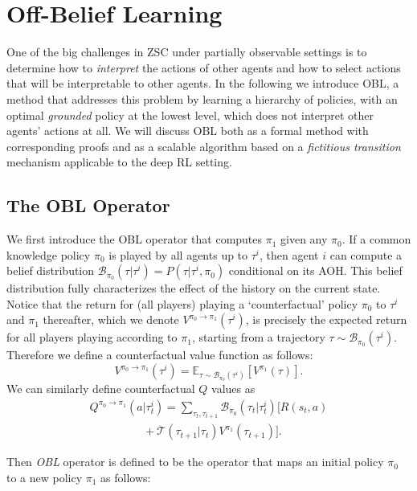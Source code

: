 \section{Off-Belief Learning}
\label{sec:method}
One of the big challenges in ZSC under partially observable settings is to determine how to \emph{interpret} the actions of other agents and how to select actions that will be interpretable to other agents. 
In the following we introduce OBL, a method that addresses this problem by learning a hierarchy of policies, with an optimal \emph{grounded} policy at the lowest level, which does not interpret other agents' actions at all.
We will discuss OBL both as a formal method with corresponding proofs and as a scalable algorithm based on a \emph{fictitious transition} mechanism applicable to the deep RL setting.

\subsection{The OBL Operator}
We first introduce the OBL operator that computes $\pi_1$ given any $\pi_0$. 
If a common knowledge policy $\pi_0$ is played by all agents up to $\tau^i$, then agent $i$ can compute a belief distribution $\mathcal{B}_{\pi_0}(\tau|\tau^i)=P(\tau|\tau^i,\pi_0)$ 
conditional on its AOH. This belief distribution fully characterizes the effect of the history on the current state. Notice that the return for (all players) playing a `counterfactual' policy $\pi_0$ 
to $\tau^i$ and $\pi_1$ thereafter, which we denote $V^{\pi_0 \to \pi_1}(\tau^i)$, is precisely the expected return for all players playing according to $\pi_1$, starting from a trajectory $\tau \sim \mathcal{B}_{\pi_0}(\tau^i)$. Therefore we define a counterfactual value function as follows:
\begin{equation}
    V^{\pi_0 \to \pi_1}(\tau^i) = \mathbb{E}_{\tau \sim \mathcal{B}_{\pi_0}(\tau^i)}\left[ V^{\pi_1}(\tau) \right].
    \label{eq:V_counterfactual}
\end{equation}
We can similarly define counterfactual $Q$ values as
\begin{multline}
    Q^{\pi_0 \to \pi_1}(a|\tau_t^i) = \sum_{\tau_t,\tau_{t+1}}\mathcal{B}_{\pi_0}(\tau_t|\tau_t^i) \big[ R(s_t, a) \\
    \hspace{2cm} + \mathcal{T}(\tau_{t+1}|\tau_t) V^{\pi_1}(\tau_{t+1})\big].
    \label{eq:Q_counterfactual}
\end{multline}

Then \textit{OBL} operator is defined to be the operator that maps an initial policy $\pi_0$ to a new policy $\pi_1$ as follows:

